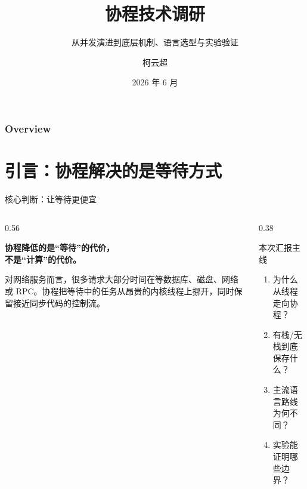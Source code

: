 \documentclass[UTF8,aspectratio=169,11pt]{ctexbeamer}
\title[协程技术调研]{协程技术调研}
\subtitle{从并发演进到底层机制、语言选型与实验验证}
\author[柯云超]{柯云超}
\institute[并行程序设计]{计算机学院 \\ \medskip \textit{并行程序设计课程展示}}
\date{2026 年 6 月}
\begin{document}
\begin{frame}
  \titlepage
\end{frame}

\begin{frame}
  \frametitle{Overview}
  \tableofcontents
\end{frame}

\section{引言：协程解决的是等待方式}

\begin{frame}{核心判断：让等待更便宜}
  \begin{columns}[T,totalwidth=\linewidth]
    \begin{column}{0.56\linewidth}
      {\LARGE\bfseries 协程降低的是“等待”的代价，\\不是“计算”的代价。\par}
      \vspace{0.35cm}
      对网络服务而言，很多请求大部分时间在等数据库、磁盘、网络或 RPC。协程把等待中的任务从昂贵的内核线程上挪开，同时保留接近同步代码的控制流。
    \end{column}
    \begin{column}{0.38\linewidth}
      \begin{block}{本次汇报主线}
        \begin{enumerate}
          \item 为什么从线程走向协程？
          \item 有栈/无栈到底保存什么？
          \item 主流语言路线为何不同？
          \item 实验能证明哪些边界？
        \end{enumerate}
      \end{block}
    \end{column}
  \end{columns}
\end{frame}
\end{document}
